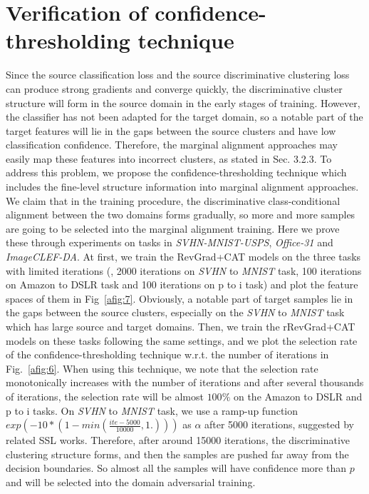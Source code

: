 \documentclass[10pt,twocolumn,letterpaper]{article}
\begin{document}
\section{Verification of confidence-thresholding technique}
Since the source classification loss and the source discriminative clustering loss can produce strong gradients and converge quickly, the discriminative cluster structure will form in the source domain in the early stages of training. However, the classifier has not been adapted for the target domain, so a notable part of the target features will lie in the gaps between the source clusters and have low classification confidence. Therefore, the marginal alignment approaches may easily map these features into incorrect clusters, as stated in Sec. 3.2.3. To address this problem, we propose the confidence-thresholding technique which includes the fine-level structure information into marginal alignment approaches. We claim that in the training procedure, the discriminative class-conditional alignment between the two domains forms gradually, so more and more samples are going to be selected into the marginal alignment training. Here we prove these through experiments on tasks in \emph{SVHN-MNIST-USPS}, \emph{Office-31} and \emph{ImageCLEF-DA}. At first, we train the RevGrad+CAT models on the three tasks with limited iterations (\ie, 2000 iterations on \emph{SVHN} to \emph{MNIST} task, 100 iterations on Amazon to DSLR task and 100 iterations on p to i task) and plot the feature spaces of them in Fig~\ref{afig:7}. Obviously, a notable part of target samples lie in the gaps between the source clusters, especially on the \emph{SVHN} to \emph{MNIST} task which has large source and target domains. Then, we train the rRevGrad+CAT models on these tasks following the same settings, and we plot the selection rate of the confidence-thresholding technique w.r.t. the number of iterations in Fig.~\ref{afig:6}. When using this technique, we note that the selection rate monotonically increases with the number of iterations and after several thousands of iterations, the selection rate will be almost $100\%$ on the Amazon to DSLR and p to i tasks. On \emph{SVHN} to \emph{MNIST} task, we use a ramp-up function $exp(-10*(1 - min(\frac{ite-5000}{10000}, 1.)))$ as $\alpha$ after 5000 iterations, suggested by related SSL works. Therefore, after around 15000 iterations, the discriminative clustering structure forms, and then the samples are pushed far away from the decision boundaries. So almost all the samples will have confidence more than $p$ and will be selected into the domain adversarial training.
\end{document}

